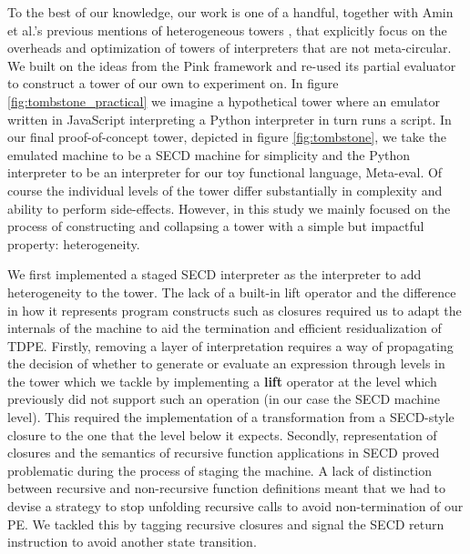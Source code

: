 \documentclass[a4paper,12pt,twoside,openright]{report}
\theoremstyle{definition}
\begin{document}
To the best of our knowledge, our work is one of a handful, together with Amin et al.'s previous mentions of heterogeneous towers \cite{amin2017collapsing}, that explicitly focus on the overheads and optimization of towers of interpreters that are not meta-circular. We built on the ideas from the Pink framework and re-used its partial evaluator to construct a tower of our own to experiment on. In figure \ref{fig:tombstone_practical} we imagine a hypothetical tower where an emulator written in JavaScript interpreting a Python interpreter in turn runs a script. In our final proof-of-concept tower, depicted in figure \ref{fig:tombstone}, we take the emulated machine to be a SECD machine for simplicity and the Python interpreter to be an interpreter for our toy functional language, Meta-eval. Of course the individual levels of the tower differ substantially in complexity and ability to perform side-effects. However, in this study we mainly focused on the process of constructing and collapsing a tower with a simple but impactful property: heterogeneity.

We first implemented a staged SECD interpreter as the interpreter to add heterogeneity to the tower. The lack of a built-in lift operator and the difference in how it represents program constructs such as closures required us to adapt the internals of the machine to aid the termination and efficient residualization of TDPE. Firstly, removing a layer of interpretation requires a way of propagating the decision of whether to generate or evaluate an expression through levels in the tower which we tackle by implementing a \textbf{lift} operator at the level which previously did not support such an operation (in our case the SECD machine level). This required the implementation of a transformation from a SECD-style closure to the one that the level below it expects. Secondly, representation of closures and the semantics of recursive function applications in SECD proved problematic during the process of staging the machine. A lack of distinction between recursive and non-recursive function definitions meant that we had to devise a strategy to stop unfolding recursive calls to avoid non-termination of our PE. We tackled this by tagging recursive closures and signal the SECD return instruction to avoid another state transition.
\end{document}
